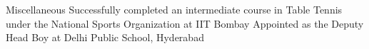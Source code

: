 
\begin{rubric}{Miscellaneous}
	\entry*[2019] Successfully completed an intermediate course in Table Tennis under the National Sports Organization at IIT Bombay	
	\entry*[2016] Appointed as the Deputy Head Boy at Delhi Public School, Hyderabad


\end{rubric}